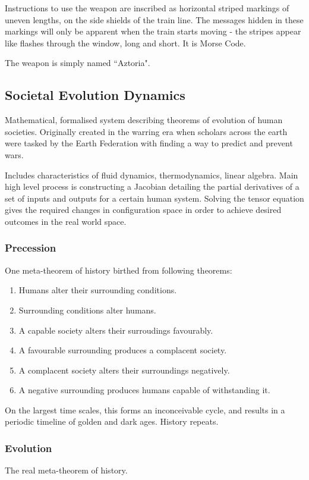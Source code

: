 \documentclass[11pt]{article}
\begin{document}
	Instructions to use the weapon are inscribed as horizontal striped markings of uneven lengths, on the side shields of the train line. 
	The messages hidden in these markings will only be apparent when the train starts moving - the stripes appear like flashes through the window, long and short. 
	It is Morse Code.
	
	The weapon is simply named ``Aztoria".
	\newpage
	
	\subsection{Societal Evolution Dynamics}
	Mathematical, formalised system describing theorems of evolution of human societies. 
	Originally created in the warring era when scholars across the earth were tasked by the Earth Federation with finding a way to predict and prevent wars.
	
	Includes characteristics of fluid dynamics, thermodynamics, linear algebra.
	Main high level process is constructing a Jacobian detailing the partial derivatives of a set of inputs and outputs for a certain human system. 
	Solving the tensor equation gives the required changes in configuration space in order to achieve desired outcomes in the real world space.
	
	\subsubsection{Precession}
	One meta-theorem of history birthed from following theorems: 
	
	\begin{enumerate}
		\item Humans alter their surrounding conditions.
		\item Surrounding conditions alter humans.
		\item A capable society alters their surroudings favourably.
		\item A favourable surrounding produces a complacent society.
		\item A complacent society alters their surroundings negatively.
		\item A negative surrounding produces humans capable of withstanding it.
	\end{enumerate}
	
	On the largest time scales, this forms an inconceivable cycle, and results in a periodic timeline of golden and dark ages. 
	History repeats.
	
	\subsubsection{Evolution}
	The real meta-theorem of history.
	
\end{document}
